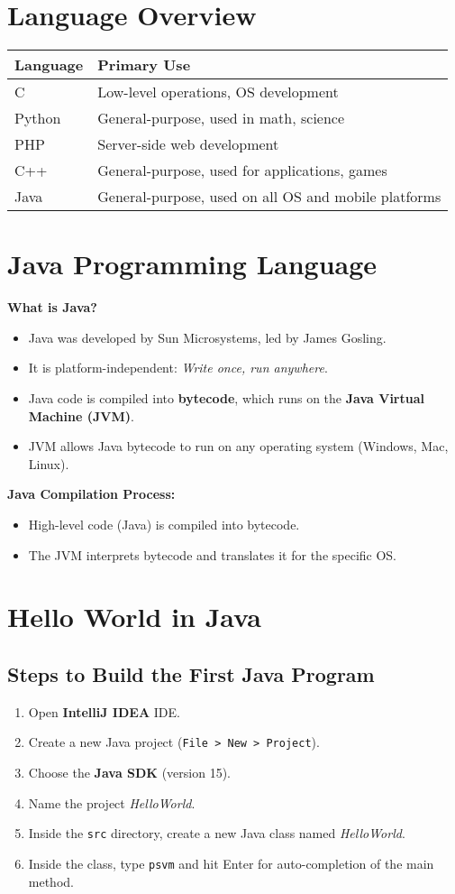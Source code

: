 \documentclass{article}
\begin{document}
\section{Language Overview}
\begin{tabular}{|l|l|}
\hline
\textbf{Language} & \textbf{Primary Use} \\
\hline
C & Low-level operations, OS development \\
Python & General-purpose, used in math, science \\
PHP & Server-side web development \\
C++ & General-purpose, used for applications, games \\
Java & General-purpose, used on all OS and mobile platforms \\
\hline
\end{tabular}

\section{Java Programming Language}
\textbf{What is Java?}
\begin{itemize}
    \item Java was developed by Sun Microsystems, led by James Gosling.
    \item It is platform-independent: \emph{Write once, run anywhere}.
    \item Java code is compiled into \textbf{bytecode}, which runs on the \textbf{Java Virtual Machine (JVM)}.
    \item JVM allows Java bytecode to run on any operating system (Windows, Mac, Linux).
\end{itemize}

\textbf{Java Compilation Process:}
\begin{itemize}
    \item High-level code (Java) is compiled into bytecode.
    \item The JVM interprets bytecode and translates it for the specific OS.
\end{itemize}

\section{Hello World in Java}
\subsection*{Steps to Build the First Java Program}
\begin{enumerate}
    \item Open \textbf{IntelliJ IDEA} IDE.
    \item Create a new Java project (\texttt{File > New > Project}).
    \item Choose the \textbf{Java SDK} (version 15).
    \item Name the project \emph{HelloWorld}.
    \item Inside the \texttt{src} directory, create a new Java class named \emph{HelloWorld}.
    \item Inside the class, type \texttt{psvm} and hit Enter for auto-completion of the main method.
\end{enumerate}
\end{document}
